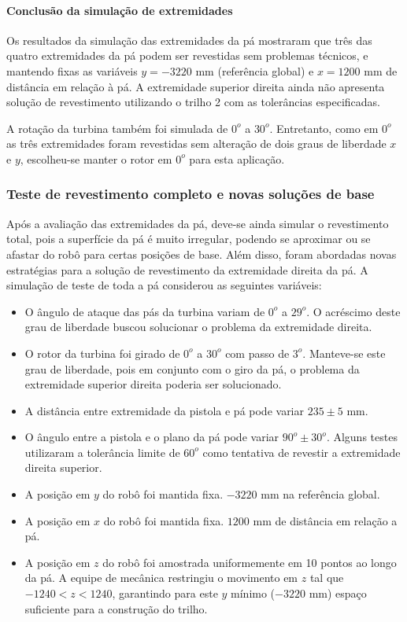\paragraph{Conclusão da simulação de extremidades}

Os resultados da simulação das extremidades da pá mostraram que três das
quatro extremidades da pá podem ser revestidas sem problemas técnicos, e
mantendo fixas as variáveis $y=-3220$ mm (referência global) e $x=1200$ mm de
distância em relação à pá. A extremidade superior direita ainda não apresenta
solução de revestimento utilizando o trilho 2 com as tolerâncias especificadas.

A rotação da turbina também foi simulada de $0^o$ a $30^o$. Entretanto, como
em $0^o$ as três extremidades foram revestidas sem alteração de dois graus de
liberdade $x$ e $y$, escolheu-se manter o rotor em $0^o$ para esta aplicação.

\subsubsection{Teste de revestimento completo e novas soluções de base}

Após a avaliação das extremidades da pá, deve-se ainda simular o revestimento
total, pois a superfície da pá é muito irregular, podendo se aproximar ou se
afastar do robô para certas posições de base. Além disso, foram abordadas novas
estratégias para a solução de revestimento da extremidade direita da pá. A
simulação de teste de toda a pá considerou as seguintes variáveis:

\begin{itemize}
  \item O ângulo de ataque das pás da turbina variam de $0^o$ a $29^o$. 
  O acréscimo deste
  grau de liberdade buscou solucionar o problema da extremidade direita.
  \item O rotor da turbina foi girado de $0^o$ a $30^o$ com passo de $3^o$.
  Manteve-se este grau de liberdade, pois em conjunto com o giro da pá, o
  problema da extremidade superior direita poderia ser solucionado.
  \item A distância entre extremidade da pistola e pá pode variar $235
  \pm 5$ mm.
  \item O ângulo entre a pistola e o plano da pá pode variar $90^o \pm
  30^o$. Alguns testes utilizaram a tolerância limite de $60^o$ como tentativa
  de revestir a extremidade direita superior.
  \item A posição em $y$ do robô foi mantida fixa. $-3220$ mm na referência
  global.
  \item A posição em $x$ do robô foi mantida fixa. $1200$ mm de
  distância em relação a pá.
  \item A posição em $z$ do robô foi amostrada uniformemente em 10 pontos ao
  longo da pá. A equipe de mecânica restringiu o movimento em $z$ tal que
  $-1240 < z < 1240$, garantindo para este $y$ mínimo ($-3220$ mm) espaço
  suficiente para a construção do trilho.
\end{itemize}

